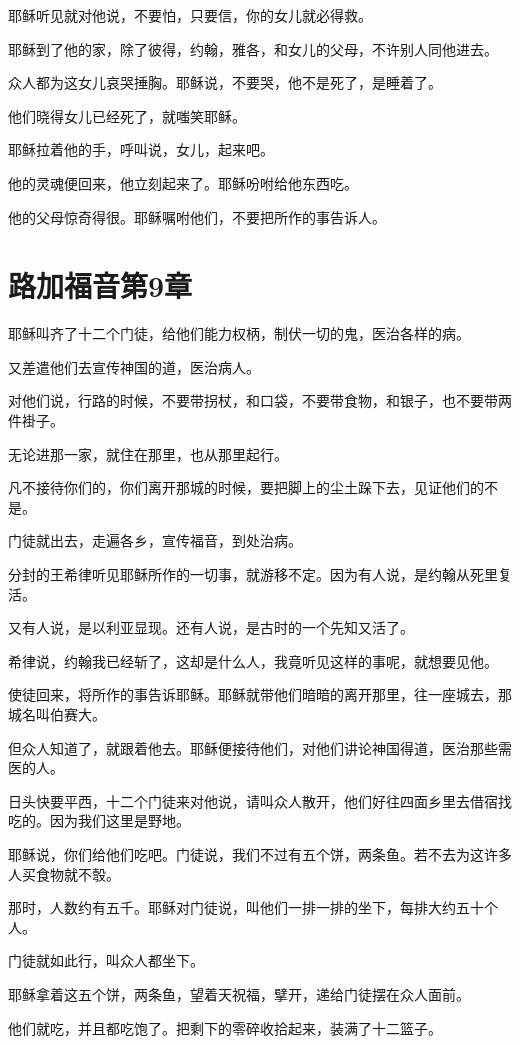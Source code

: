 \documentclass[12pt,oneside]{book}
\begin{document}
耶稣听见就对他说，不要怕，只要信，你的女儿就必得救。

耶稣到了他的家，除了彼得，约翰，雅各，和女儿的父母，不许别人同他进去。

众人都为这女儿哀哭捶胸。耶稣说，不要哭，他不是死了，是睡着了。

他们晓得女儿已经死了，就嗤笑耶稣。

耶稣拉着他的手，呼叫说，女儿，起来吧。

他的灵魂便回来，他立刻起来了。耶稣吩咐给他东西吃。

他的父母惊奇得很。耶稣嘱咐他们，不要把所作的事告诉人。

\chapter{路加福音第9章}
耶稣叫齐了十二个门徒，给他们能力权柄，制伏一切的鬼，医治各样的病。

又差遣他们去宣传神国的道，医治病人。

对他们说，行路的时候，不要带拐杖，和口袋，不要带食物，和银子，也不要带两件褂子。

无论进那一家，就住在那里，也从那里起行。

凡不接待你们的，你们离开那城的时候，要把脚上的尘土跺下去，见证他们的不是。

门徒就出去，走遍各乡，宣传福音，到处治病。

分封的王希律听见耶稣所作的一切事，就游移不定。因为有人说，是约翰从死里复活。

又有人说，是以利亚显现。还有人说，是古时的一个先知又活了。

希律说，约翰我已经斩了，这却是什么人，我竟听见这样的事呢，就想要见他。

使徒回来，将所作的事告诉耶稣。耶稣就带他们暗暗的离开那里，往一座城去，那城名叫伯赛大。

但众人知道了，就跟着他去。耶稣便接待他们，对他们讲论神国得道，医治那些需医的人。

日头快要平西，十二个门徒来对他说，请叫众人散开，他们好往四面乡里去借宿找吃的。因为我们这里是野地。

耶稣说，你们给他们吃吧。门徒说，我们不过有五个饼，两条鱼。若不去为这许多人买食物就不彀。

那时，人数约有五千。耶稣对门徒说，叫他们一排一排的坐下，每排大约五十个人。

门徒就如此行，叫众人都坐下。

耶稣拿着这五个饼，两条鱼，望着天祝福，擘开，递给门徒摆在众人面前。

他们就吃，并且都吃饱了。把剩下的零碎收拾起来，装满了十二篮子。
\end{document}
